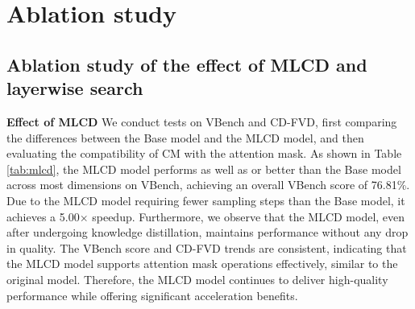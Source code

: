 \newpage
\section{Ablation study}

\subsection{Ablation study of the effect of MLCD and layerwise search}
\label{appendix:abl}


\textbf{Effect of MLCD} We conduct tests on VBench and CD-FVD, first comparing the differences between the Base model and the MLCD model, and then evaluating the compatibility of CM with the attention mask. As shown in Table \ref{tab:mlcd}, the MLCD model performs as well as or better than the Base model across most dimensions on VBench, achieving an overall VBench score of 76.81\%. Due to the MLCD model requiring fewer sampling steps than the Base model, it achieves a 5.00$\times$ speedup. Furthermore, we observe that the MLCD model, even after undergoing knowledge distillation, maintains performance without any drop in quality. The VBench score and CD-FVD trends are consistent, indicating that the MLCD model supports attention mask operations effectively, similar to the original model. Therefore, the MLCD model continues to deliver high-quality performance while offering significant acceleration benefits.

